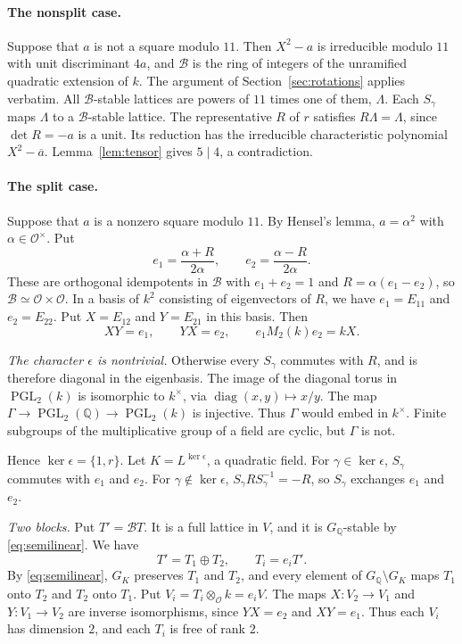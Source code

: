 \documentclass[11pt]{article}
\theoremstyle{remark}
\newcommand{\Q}{\mathbb Q}
\DeclareMathOperator{\PGL}{PGL}
\begin{document}
\paragraph{The nonsplit case.}
Suppose that \(a\) is not a square modulo \(11\). Then \(X^2-a\) is
irreducible modulo \(11\) with unit discriminant \(4a\), and
\(\mathcal B\) is the ring of integers of the unramified quadratic
extension of \(k\). The argument of Section~\ref{sec:rotations}
applies verbatim. All \(\mathcal B\)-stable lattices are powers of
\(11\) times one of them, \(\Lambda\). Each \(S_\gamma\) maps
\(\Lambda\) to a \(\mathcal B\)-stable lattice. The representative
\(R\) of \(r\) satisfies \(R\Lambda=\Lambda\), since \(\det R=-a\) is
a unit. Its reduction has the irreducible characteristic polynomial
\(X^2-\overline a\). Lemma~\ref{lem:tensor} gives \(5\mid4\), a
contradiction.

\paragraph{The split case.}
Suppose that \(a\) is a nonzero square modulo \(11\). By Hensel's
lemma, \(a=\alpha^2\) with \(\alpha\in\mathcal O^\times\). Put
\[
 e_1=\frac{\alpha+R}{2\alpha},\qquad e_2=\frac{\alpha-R}{2\alpha}.
\]
These are orthogonal idempotents in \(\mathcal B\) with
\(e_1+e_2=1\) and \(R=\alpha(e_1-e_2)\), so
\(\mathcal B\simeq\mathcal O\times\mathcal O\). In a basis of
\(k^2\) consisting of eigenvectors of \(R\), we have
\(e_1=E_{11}\) and \(e_2=E_{22}\). Put \(X=E_{12}\) and
\(Y=E_{21}\) in this basis. Then
\[
 XY=e_1,\qquad YX=e_2,\qquad e_1M_2(k)e_2=kX.
\]

\emph{The character \(\epsilon\) is nontrivial.} Otherwise every
\(S_\gamma\) commutes with \(R\), and is therefore diagonal in the
eigenbasis. The image of the diagonal torus in \(\PGL_2(k)\) is
isomorphic to \(k^\times\), via
\(\operatorname{diag}(x,y)\mapsto x/y\). The map
\(\Gamma\to\PGL_2(\Q)\to\PGL_2(k)\) is injective. Thus \(\Gamma\) would
embed in \(k^\times\). Finite subgroups of the multiplicative group of
a field are cyclic, but \(\Gamma\) is not.

Hence \(\ker\epsilon=\{1,r\}\). Let \(K=L^{\ker\epsilon}\), a quadratic
field. For \(\gamma\in\ker\epsilon\), \(S_\gamma\) commutes with
\(e_1\) and \(e_2\). For \(\gamma\notin\ker\epsilon\),
\(S_\gamma RS_\gamma^{-1}=-R\), so \(S_\gamma\) exchanges \(e_1\) and
\(e_2\).

\emph{Two blocks.} Put \(T'=\mathcal BT\). It is a full lattice in
\(V\), and it is \(G_{\Q}\)-stable by \eqref{eq:semilinear}. We have
\[
 T'=T_1\oplus T_2,\qquad T_i=e_iT'.
\]
By \eqref{eq:semilinear}, \(G_K\) preserves \(T_1\) and \(T_2\), and
every element of \(G_{\Q}\setminus G_K\) maps \(T_1\) onto \(T_2\) and
\(T_2\) onto \(T_1\). Put \(V_i=T_i\otimes_{\mathcal O}k=e_iV\). The
maps \(X:V_2\to V_1\) and \(Y:V_1\to V_2\) are inverse isomorphisms,
since \(YX=e_2\) and \(XY=e_1\). Thus each \(V_i\) has dimension
\(2\), and each \(T_i\) is free of rank \(2\).
\end{document}

